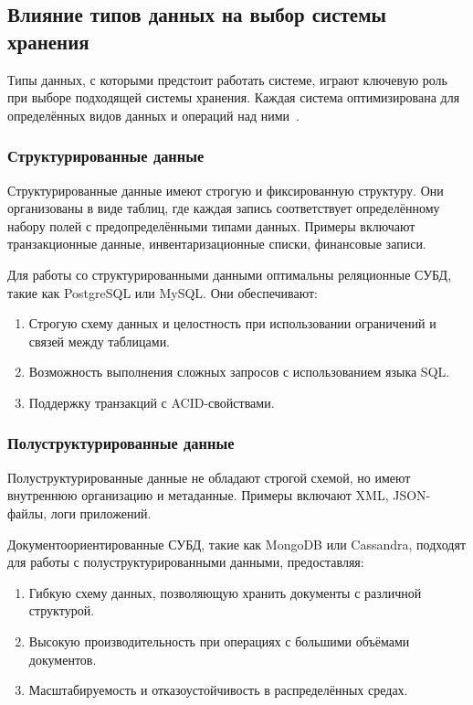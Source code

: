 \subsection{Влияние типов данных на выбор системы хранения}

Типы данных, с которыми предстоит работать системе, играют ключевую роль при выборе подходящей системы хранения. 
Каждая система оптимизирована для определённых видов данных и операций над ними~\cite{systems}.

\subsubsection{Структурированные данные}

Структурированные данные имеют строгую и фиксированную структуру. 
Они организованы в виде таблиц, где каждая запись соответствует определённому набору полей с предопределёнными типами данных. 
Примеры включают транзакционные данные, инвентаризационные списки, финансовые записи.

\clearpage
Для работы со структурированными данными оптимальны реляционные СУБД, такие как PostgreSQL или MySQL. 
Они обеспечивают:

\begin{enumerate}[wide=12.5mm, leftmargin=12.5mm]
    \item Строгую схему данных и целостность при использовании ограничений и связей между таблицами.
    \item Возможность выполнения сложных запросов с использованием языка SQL.
    \item Поддержку транзакций с ACID-свойствами.
\end{enumerate}

\subsubsection{Полуструктурированные данные}

Полуструктурированные данные не обладают строгой схемой, но имеют внутреннюю организацию и метаданные. 
Примеры включают XML, JSON-файлы, логи приложений.

Документоориентированные СУБД, такие как MongoDB или Cassandra, подходят для работы с полуструктурированными данными, предоставляя:

\begin{enumerate}[wide=12.5mm, leftmargin=12.5mm]
    \item Гибкую схему данных, позволяющую хранить документы с различной структурой.
    \item Высокую производительность при операциях с большими объёмами документов.
    \item Масштабируемость и отказоустойчивость в распределённых средах.
\end{enumerate}


